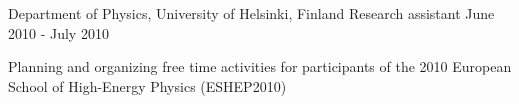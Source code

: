 \begin{cventries}
  \cventry
    {Department of Physics, University of Helsinki, Finland} %
    {Research assistant} %
    {} %
    {June 2010 - July 2010} %
    {
      \begin{cvitems} %
        \item {Planning and organizing free time activities for participants of the 2010 European School of High-Energy Physics (ESHEP2010)}
      \end{cvitems}
}

\end{cventries}
